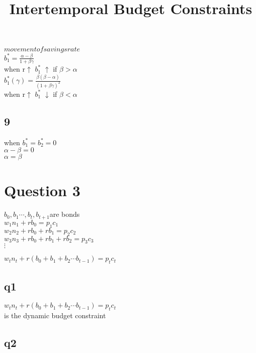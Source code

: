\documentclass[11pt]{article}
\begin{document}
$movement of savings rate $\\

$b_{1}^{*}=\frac{\alpha-\beta}{1+\beta \gamma}$\\

when r$\uparrow$   $b_{1}^{*}$ $\uparrow$ if $\beta >\alpha$\\

$b_{1}^{*}(\gamma)=\frac{\beta(\beta-\alpha)}{(1+\beta \gamma)^{2}}$\\

when r$\uparrow$   $b_{1}^{*}$ $\downarrow$ if $\beta <\alpha$\\

\subsection{9}

when $b_{1}^{*}=b_{2}^{*}=0$\\

$\alpha-\beta=0$\\

$\alpha=\beta$\\

\section{Question 3}
\title{Intertemporal Budget Constraints}

$b_{0},b_{1}\cdots,b_{t},b_{t+1} $are bonds\\

$w_{1}n_{1}+rb_{0}=p_{1}c_{1}$\\


$w_{2}n_{2}+rb_{0}+rb_{1}=p_{2}c_{2}$\\

$w_{3}n_{3}+rb_{0}+rb_{1}+rb_{2}=p_{3}c_{3}$\\

$\vdots$

$w_{t}n_{t}+r(b_{0}+b_{1}+b_{2}\cdots b_{t-1}) =p_{t}c_{t}$\\

\subsection{q1}
$w_{t}n_{t}+r(b_{0}+b_{1}+b_{2}\cdots b_{t-1}) =p_{t}c_{t}$\\ is the dynamic budget constraint

\subsection{q2}
\end{document}

